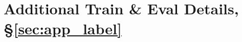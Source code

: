
\begin{comment}
\begin{figure*}
\centering
\texttt{[image: figures/mturk\_instruction.pdf]}
\vspace{-1pt}
\caption{
The instruction for the \nli labeling task in \S\ref{sec:app_label}, with annotators labeling the perturbed hypotheses (\emph{New S2}). 
Instructions are similar for \qqp and \sst, except for the label definitions and the examples.
\wts{Maybe remove.}
}
\vspace{-10pt}
\label{fig:mturk_instruction}

\end{figure*}
\end{comment}


\section{Additional Train \& Eval Details, \S\ref{sec:app_label}}
\label{appendix:app_label}



\begin{comment}
\subsection{Tasks \& Data}
\label{appendix:app_label_data}
\wts{Maybe remove.}
\textbf{Sentiment Analysis (\sst)} aims to determine the sentiment polarity of a given sentence (\emph{positive} or \emph{negative}). 
We select Stanford Sentiment Treebank (\dsst)~\cite{socher2013recursive} as the base dataset for augmentation.
It contains sentences extracted from full movie reviews on Rotten Tomatoes, which is relatively more aligned with the training data for \sysname. 
While the dataset also contains finer-grained labels on subphrases, we only use full sentences.
As a result, the full training data contains 6,920 sentences.

\textbf{Natural Language Inference (\nli)} is a 3-way classification task, with inputs consisting of two sentences, a premise and a hypothesis, and the three possible labels being \emph{entailment}, \emph{contradiction}, and \emph{neutral}.
We augment the data based on \dnli~\cite{bowman-etal-2015-large}. 
 
\textbf{Duplicate Question Detection (\qqp)} analyzes whether two questions are duplicates of each other (\ie, if you have the answer to one question, whether you can infer the answer for the other one.) 
We use \dqqp as the base dataset~\cite{wang2018glue}, a collection of question pairs from the community question-answering website Quora.
\end{comment}


